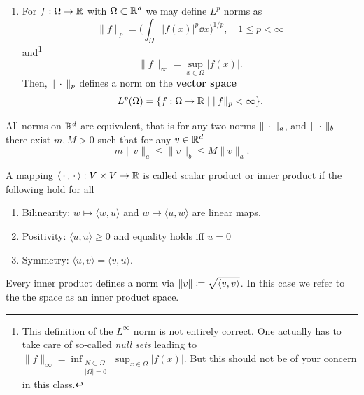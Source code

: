 \begin{example}
\begin{enumerate}
\begin{itemize}
\begin{gather}
            \end{gather}
        \end{itemize}
        where $\lambda_{\text{max}}$ denotes the largest eigenvalue.
        \item For $f:\Omega\rightarrow\mathbb{R}$ with $\Omega\subset \mathbb{R}^d$ we may define $L^p$ norms as
        \begin{equation}
            \|f\|_p = \bigg(\int_\Omega |f(x)|^p \dd x\bigg)^{1/p},\quad 1\leq p<\infty
        \end{equation}
        and\footnote{This definition of the $L^\infty$ norm is not entirely correct. One actually has to take care of so-called \emph{null sets} leading to $\|f\|_\infty = \inf_{\substack{N\subset \Omega\\ |\Omega|=0}}\sup_{x\in\Omega}|f(x)|$. But this should not be of your concern in this class.}
        \begin{equation}
            \|f\|_\infty = \sup_{x\in\Omega}|f(x)|.
        \end{equation}
        Then, $\|\,\cdot\,\|_p$ defines a norm on the \textbf{vector space}
        \begin{equation}
            L^p(\Omega) = \{f:\Omega\rightarrow \mathbb{R}\;|\; \|f\|_p<\infty\}.
        \end{equation}
    \end{enumerate}
\end{example}

\begin{theorem}
    All norms on $\mathbb{R}^d$ are equivalent, that is for any two norms $\|\,\cdot\,\|_a$, and $\|\,\cdot\,\|_b$ there exist $m,M>0$ such that for any $v\in\mathbb{R}^d$
    \begin{equation}
        m\|v\|_a\leq \|v\|_b\leq M\|v\|_a.
    \end{equation}
\end{theorem}

\begin{defn}
    A mapping $\langle\,\cdot\,,\,\cdot\,\rangle:V\times V\rightarrow \mathbb{R}$ is called scalar product or inner product if the following hold for all
    \begin{enumerate}
        \item Bilinearity: $w\mapsto \langle w, u\rangle$ and $w\mapsto \langle u, w\rangle$ are linear maps.
        \item Positivity: $\langle u, u\rangle\geq 0$ and equality holds iff $u=0$
        \item Symmetry: $\langle u,v \rangle = \langle v,u\rangle$.
    \end{enumerate}
    Every inner product defines a norm via $\|v\| \coloneq\sqrt{\left\langle v , v\right\rangle}$. In this case we refer to the the space as an inner product space.
\end{defn}

